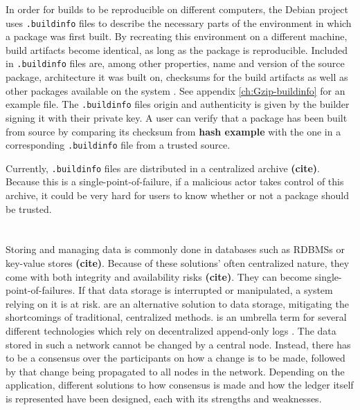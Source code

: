 \documentclass[english, biblatex, digitaloutput]{kththesis}
\begin{document}
In order for builds to be reproducible on different computers, the Debian project uses \texttt{.buildinfo} files to describe the necessary parts of the environment in which a package was first built. By recreating this environment on a different machine, build artifacts become identical, as long as the package is reproducible. Included in \texttt{.buildinfo} files are, among other properties, name and version of the source package, architecture it was built on, checksums for the build artifacts as well as other packages available on the system \cite{lamb_reproducible_2021}. See appendix \ref{ch:Gzip-buildinfo} for an example file. The \texttt{.buildinfo} files origin and authenticity is given by the builder signing it with their private  key. A user can verify that a package has been built from source by comparing its checksum from \textbf{hash example} with the one in a corresponding \texttt{.buildinfo} file from a trusted source.

Currently, \texttt{.buildinfo} files are distributed in a centralized archive \textbf{(cite)}. Because this is a single-point-of-failure, if a malicious actor takes control of this archive, it could be very hard for users to know whether or not a package should be trusted.




\section{}

Storing and managing data is commonly done in databases such as \glspl{RDBMS} or key-value stores \textbf{(cite)}. Because of these solutions' often centralized nature, they come with both integrity and availability risks \textbf{(cite)}. They can become single-point-of-failures. If that data storage is interrupted or manipulated, a system relying on it is at risk.  are an alternative solution to data storage, mitigating the shortcomings of traditional, centralized methods.  is an umbrella term for several different technologies which rely on decentralized append-only logs \cite{kannengieser_trade-offs_2021} . The data stored in such a network cannot be changed by a central node. Instead, there has to be a consensus over the participants on how a change is to be made, followed by that change being propagated to all nodes in the network. Depending on the application, different solutions to how consensus is made and how the ledger itself is represented have been designed, each with its strengths and weaknesses.
\end{document}
